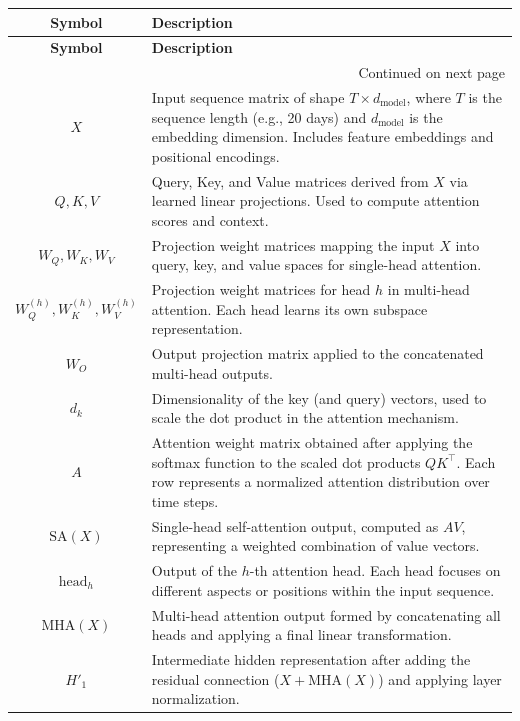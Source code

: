 \begin{center}
\begin{longtable}{|c|p{}|}
\hline
\textbf{Symbol} & \textbf{Description} \\
\hline
\endfirsthead

\hline
\textbf{Symbol} & \textbf{Description} \\
\hline
\endhead

\hline
\multicolumn{2}{|r|}{{Continued on next page}} \\
\hline
\endfoot

\hline
\endlastfoot

$X$ & Input sequence matrix of shape $T \times d_{\text{model}}$, where $T$ is the sequence length (e.g., 20 days) and $d_{\text{model}}$ is the embedding dimension. Includes feature embeddings and positional encodings. \\ \hline
$Q, K, V$ & Query, Key, and Value matrices derived from $X$ via learned linear projections. Used to compute attention scores and context. \\ \hline
$W_Q, W_K, W_V$ & Projection weight matrices mapping the input $X$ into query, key, and value spaces for single-head attention. \\ \hline
$W_Q^{(h)}, W_K^{(h)}, W_V^{(h)}$ & Projection weight matrices for head $h$ in multi-head attention. Each head learns its own subspace representation. \\ \hline
$W_O$ & Output projection matrix applied to the concatenated multi-head outputs. \\ \hline
$d_k$ & Dimensionality of the key (and query) vectors, used to scale the dot product in the attention mechanism. \\ \hline
$A$ & Attention weight matrix obtained after applying the softmax function to the scaled dot products $QK^\top$. Each row represents a normalized attention distribution over time steps. \\ \hline
$\text{SA}(X)$ & Single-head self-attention output, computed as $A V$, representing a weighted combination of value vectors. \\ \hline
$\text{head}_h$ & Output of the $h$-th attention head. Each head focuses on different aspects or positions within the input sequence. \\ \hline
$\text{MHA}(X)$ & Multi-head attention output formed by concatenating all heads and applying a final linear transformation. \\ \hline
$H'_1$ & Intermediate hidden representation after adding the residual connection ($X + \text{MHA}(X)$) and applying layer normalization. \\ \hline

\end{longtable}
\end{center}
